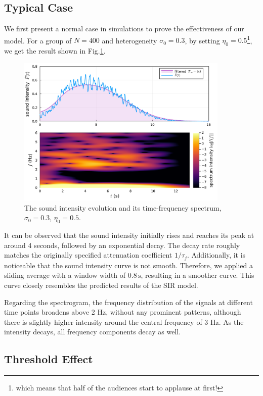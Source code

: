 \documentclass[UTF8,a4paper,11pt]{ctexart}
\begin{document}
\subsection{Typical Case}

We first present a normal case in simulations to prove the effectiveness of our model. For a group of $N=400$ and heterogeneity $σ_0=0.3$, by setting $η_0=0.5$\footnote{which means that half of the audiences start to applause at first!}, we get the result shown in Fig.\ref{fig:typicalcase}.

\begin{figure}[H]
    \centering
    \includegraphics[width=0.9\textwidth]{sigma03typical.pdf}
    \caption{The sound intensity evolution and its time-frequency spectrum, $σ_0 = 0.3$, $η_0=0.5$.}
    \label{fig:typicalcase}
\end{figure}

It can be observed that the sound intensity initially rises and reaches its peak at around 4 seconds, followed by an exponential decay. The decay rate roughly matches the originally specified attenuation coefficient $1/τ_j$. Additionally, it is noticeable that the sound intensity curve is not smooth. Therefore, we applied a sliding average with a window width of $0.8\,\mathrm{s}$, resulting in a smoother curve. This curve closely resembles the predicted results of the SIR model.

Regarding the spectrogram, the frequency distribution of the signals at different time points broadens above 2 Hz, without any prominent patterns, although there is slightly higher intensity around the central frequency of 3 Hz. As the intensity decays, all frequency components decay as well.

\subsection{Threshold Effect}
\end{document}
